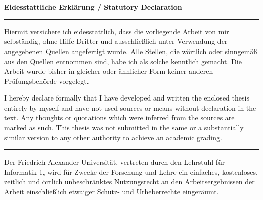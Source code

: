 \documentclass[10pt,twoside,a4paper,bibliography=totoc]{scrbook}
\begin{document}

%
%


\chapter*{\ }


\vspace*{\fill}


\begin{Large}
	\textbf{Eidesstattliche Erklärung / Statutory Declaration}
\end{Large}
\vspace{1.5em}


\noindent\hrule

Hiermit versichere ich eidesstattlich, dass die vorliegende Arbeit von mir
selbständig, ohne Hilfe Dritter und ausschließlich unter Verwendung der
angegebenen Quellen angefertigt wurde. Alle Stellen, die wörtlich oder
sinngemäß aus den Quellen entnommen sind, habe ich als solche kennt\-lich
gemacht. Die Arbeit wurde bisher in gleicher oder ähnlicher Form keiner anderen
Prüfungsbehörde vorgelegt. 
\vspace{1.5em}


I hereby declare formally that I have developed and written the enclosed thesis
entirely by myself and have not used sources or means without declaration in
the text. Any thoughts or quotations which were inferred from the sources are
marked as such. This thesis was not submitted in the same or a substantially
similar version to any other authority to achieve an academic grading. 

\noindent\hrule

\vspace{2em}


Der Friedrich-Alexander-Universität, vertreten durch den Lehrstuhl
für Informatik 1, wird für Zwecke der Forschung und Lehre ein
einfaches, kostenloses, zeitlich und örtlich unbeschränktes
Nutzungsrecht an den Arbeitsergebnissen der Arbeit einschließlich
etwaiger Schutz- und Urheberrechte eingeräumt.


\vspace{2em}
\end{document}
